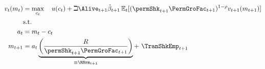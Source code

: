   \begin{equation*}\begin{gathered}\begin{aligned}
        {\vFunc}_{\prd}({m}_{\prd})  & = \max_{{c}_{\prd}}~~~ \uFunc({c}_{\prd})+\beth\Alive_{\prd+1}\hat{\DiscFac}_{\prd+1}
        \Ex_{\prd}[(\permShk_{\prd+1}\PermGroFac_{\prd+1})^{1-\CRRA}{\vFunc}_{\prd+1}({m}_{\prd+1})]   \\
        & \text{s.t.}   \nonumber \\
        {a}_{\prd}    & = {m}_{\prd}-{c}_{\prd} \nonumber
        \\      {m}_{\prd+1}  & = {a}_{\prd}\underbrace{\left(\frac{\Rfree}{\permShk_{\prd+1}\PermGroFac_{\prd+1}}\right)}_{\equiv \RNrm_{\prd+1}}+ ~\TranShkEmp_{\prd+1}
      \end{aligned}\end{gathered}\end{equation*}
